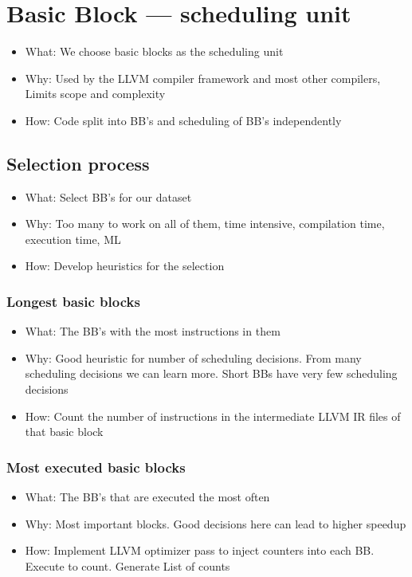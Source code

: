 \section{Basic Block --- scheduling unit}
\label{sec:approach:basicblock}
\begin{itemize}
    \item What: We choose basic blocks as the scheduling unit
    \item Why: Used by the LLVM compiler framework and most other compilers, Limits scope and complexity
    \item How: Code split into BB's and scheduling of BB's independently
\end{itemize}

\subsection{Selection process}
\label{sec:approach:basicblock:selection}
\begin{itemize}
    \item What: Select BB's for our dataset
    \item Why: Too many to work on all of them, time intensive, compilation time, execution time, ML
    \item How: Develop heuristics for the selection
\end{itemize}
\subsubsection{Longest basic blocks}
\begin{itemize}
    \item What: The BB's with the most instructions in them
    \item Why: Good heuristic for number of scheduling decisions. From many scheduling decisions we can learn more. Short BBs have very few scheduling decisions
    \item How: Count the number of instructions in the intermediate LLVM IR files of that basic block
\end{itemize}
\subsubsection{Most executed basic blocks}
\begin{itemize}
    \item What: The BB's that are executed the most often
    \item Why: Most important blocks. Good decisions here can lead to higher speedup
    \item How: Implement LLVM optimizer pass to inject counters into each BB. Execute to count. Generate List of counts
\end{itemize}
